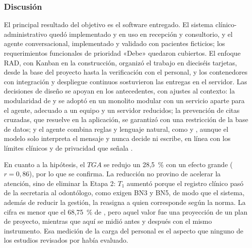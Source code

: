 

\subsubsection{Discusión}

El principal resultado del objetivo es el software entregado. El sistema clínico-administrativo quedó implementado y en uso en recepción y consultorio, y el agente conversacional, implementado y validado con pacientes ficticios; los requerimientos funcionales de prioridad «Debe» quedaron cubiertos. El enfoque RAD, con Kanban en la construcción, organizó el trabajo en dieciséis tarjetas, desde la base del proyecto hasta la verificación con el personal, y los contenedores con integración y despliegue continuos sostuvieron las entregas en el servidor. Las decisiones de diseño se apoyan en los antecedentes, con ajustes al contexto: la modularidad de \cite{roca2020microservice} y \cite{arcila2022microservice} se adoptó en un monolito modular con un servicio aparte para el agente, adecuado a un equipo y un servidor reducidos; la prevención de citas cruzadas, que \cite{shaikh2026smartmedibook} resuelve en la aplicación, se garantizó con una restricción de la base de datos; y el agente combina reglas y lenguaje natural, como \cite{santhosh2026whatsapp} y \cite{alejandrino2023dental}, aunque el modelo solo interpreta el mensaje y nunca decide ni escribe, en línea con los límites clínicos y de privacidad que señala \cite{hindelang2024chatbots}.

En cuanto a la hipótesis, el $TGA$ se redujo un 28,5~\% con un efecto grande ($r = 0{,}86$), por lo que se confirma. La reducción no provino de acelerar la atención, sino de eliminar la Etapa 2: $T_1$ aumentó porque el registro clínico pasó de la secretaria al odontólogo, como exigen BN3 y BN5, de modo que el sistema, además de reducir la gestión, la reasigna a quien corresponde según la norma. La cifra es menor que el 68,75~\% de \cite{alejandrino2023dental}, pero aquel valor fue una proyección de un plan de proyecto, mientras que aquí se midió antes y después con el mismo instrumento. Esa medición de la carga del personal es el aspecto que ninguno de los estudios revisados por \cite{tudorcar2020conversational} había evaluado.

